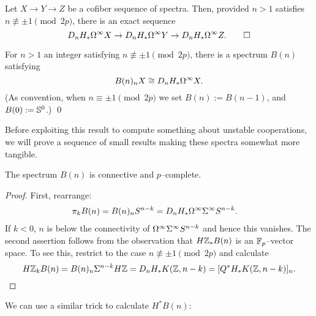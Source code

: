 \begin{theorem}
Let $X \to Y \to Z$ be a cofiber sequence of spectra.  Then, provided $n > 1$ satisfies $n \not\equiv \pm 1 \pmod{2p}$, there is an exact sequence \[D_n H_* \Loops^\infty X \to D_n H_* \Loops^\infty Y \to D_n H_* \Loops^\infty Z. \qed\]
\end{theorem}

\begin{corollary}
For $n > 1$ an integer satisfying $n \not\equiv \pm 1 \pmod{2p}$, there is a spectrum $B(n)$ satisfying \[B(n)_n X \cong D_n H_* \Loops^\infty X.\] (As convention, when $n \equiv \pm 1 \pmod{2p}$ we set $B(n) := B(n-1)$, and $B(0) := \S^0$.)   \qed
\end{corollary}

Before exploiting this result to compute something about unstable cooperations, we will prove a sequence of small results making these spectra somewhat more tangible.

\begin{lemma}
The spectrum $B(n)$ is connective and $p$--complete.
\end{lemma}
\begin{proof}
First, rearrange:
\begin{align*}
\pi_k B(n) & = B(n)_n S^{n-k} = D_n H_* \Loops^\infty \Susp^\infty S^{n-k}.
\end{align*}
If $k < 0$, $n$ is below the connectivity of $\Loops^\infty \Susp^\infty S^{n-k}$ and hence this vanishes.  The second assertion follows from the observation that $H\Z_* B(n)$ is an $\F_p$--vector space.  To see this, restrict to the case $n \not\equiv \pm 1 \pmod{2p}$ and calculate \[H\Z_k B(n) = B(n)_n \Susp^{n-k} H\Z = D_n H_* K(\Z, n-k) = [Q^* H_* K(\Z, n-k)]_n. \qedhere\]
\end{proof}

\noindent We can use a similar trick to calculate $H^* B(n)$:

